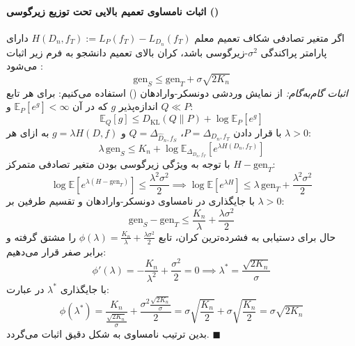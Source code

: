 \paragraph*{اثبات نامساوی تعمیم بالایی تحت توزیع زیرگوسی ()}
اگر متغیر تصادفی شکاف تعمیم معلم $H(D_n, f_T) := L_P(f_T) - L_{D_n}(f_T)$ دارای پارامتر پراکندگی $\sigma^2$-زیرگوسی باشد، کران بالای تعمیم دانشجو به فرم زیر اثبات می‌شود \cite{li2026generalization}:
\begin{equation}
    \text{gen}_S \le \text{gen}_T + \sigma \sqrt{2 K_n}
\end{equation}
\textit{اثبات گام‌به‌گام:} از نمایش وردشی دونسکر-وارادهان () استفاده می‌کنیم: برای هر تابع اندازه‌پذیر $g$ که در آن $\mathbb{E}_P[e^g] < \infty$ و $Q \ll P$:
\begin{equation}
    \mathbb{E}_Q[g] \le D_{\text{KL}}(Q \parallel P) + \log \mathbb{E}_P[e^g]
\end{equation}
با قرار دادن $P = \Delta_{D_n, f_T}$، $Q = \Delta_{\hat{D}_n, f_S}$ و $g = \lambda H(D, f)$ به ازای هر $\lambda > 0$:
\begin{equation}
    \lambda \, \text{gen}_S \le K_n + \log \mathbb{E}_{\Delta_{D_n, f_T}} \left[ e^{\lambda H(D_n, f_T)} \right]
\end{equation}
با توجه به ویژگی زیرگوسی بودن متغیر تصادفی متمرکز $H - \text{gen}_T$:
\begin{equation}
    \log \mathbb{E} \left[ e^{\lambda(H - \text{gen}_T)} \right] \le \frac{\lambda^2 \sigma^2}{2} \implies \log \mathbb{E} \left[ e^{\lambda H} \right] \le \lambda \, \text{gen}_T + \frac{\lambda^2 \sigma^2}{2}
\end{equation}
با جایگذاری در نامساوی دونسکر-وارادهان و تقسیم طرفین بر $\lambda > 0$:
\begin{equation}
    \text{gen}_S - \text{gen}_T \le \frac{K_n}{\lambda} + \frac{\lambda \sigma^2}{2}
\end{equation}
حال برای دستیابی به فشرده‌ترین کران، تابع $\phi(\lambda) = \frac{K_n}{\lambda} + \frac{\lambda \sigma^2}{2}$ را مشتق گرفته و برابر صفر قرار می‌دهیم:
\begin{equation}
    \phi'(\lambda) = -\frac{K_n}{\lambda^2} + \frac{\sigma^2}{2} = 0 \implies \lambda^* = \frac{\sqrt{2 K_n}}{\sigma}
\end{equation}
با جایگذاری $\lambda^*$ در عبارت:
\begin{equation}
    \phi(\lambda^*) = \frac{K_n}{\frac{\sqrt{2 K_n}}{\sigma}} + \frac{\sigma^2 \frac{\sqrt{2 K_n}}{\sigma}}{2} = \sigma \sqrt{\frac{K_n}{2}} + \sigma \sqrt{\frac{K_n}{2}} = \sigma \sqrt{2 K_n}
\end{equation}
بدین ترتیب نامساوی به شکل دقیق اثبات می‌گردد. $\blacksquare$

